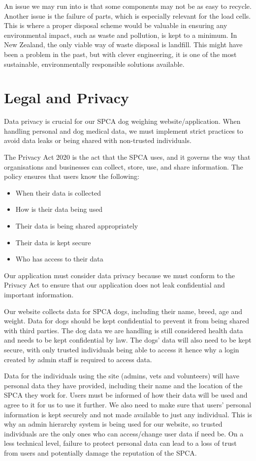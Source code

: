 An issue we may run into is that some components may not be as easy to recycle. Another issue is the failure of parts, which is especially relevant for the load cells. This is where a proper disposal scheme would be valuable in ensuring any environmental impact, such as waste and pollution, is kept to a minimum. In New Zealand, the only viable way of waste disposal is landfill. This might have been a problem in the past, but with clever engineering, it is one of the most sustainable, environmentally responsible solutions available.

\section{Legal and Privacy}

Data privacy is crucial for our SPCA dog weighing website/application. When handling personal and dog medical data, we must implement strict practices to avoid data leaks or being shared with non-trusted individuals.

The Privacy Act 2020 is the act that the SPCA uses, and it governs the way that organisations and businesses can collect, store, use, and share information. The policy ensures that users know the following:
\begin{itemize}
    \item When their data is collected
    \item How is their data being used
    \item Their data is being shared appropriately
    \item Their data is kept secure
    \item Who has access to their data
\end{itemize}

Our application must consider data privacy because we must conform to the Privacy Act to ensure that our application does not leak confidential and important information.

Our website collects data for SPCA dogs, including their name, breed, age and weight. Data for dogs should be kept confidential to prevent it from being shared with third parties. The dog data we are handling is still considered health data and needs to be kept confidential by law. The dogs’ data will also need to be kept secure, with only trusted individuals being able to access it hence why a login created by admin staff is required to access data.

Data for the individuals using the site (admins, vets and volunteers) will have personal data they have provided, including their name and the location of the SPCA they work for. Users must be informed of how their data will be used and agree to it for us to use it further. We also need to make sure that users’ personal information is kept securely and not made available to just any individual. This is why an admin hierarchy system is being used for our website, so trusted individuals are the only ones who can access/change user data if need be. On a less technical level, failure to protect personal data can lead to a loss of trust from users and potentially damage the reputation of the SPCA.

